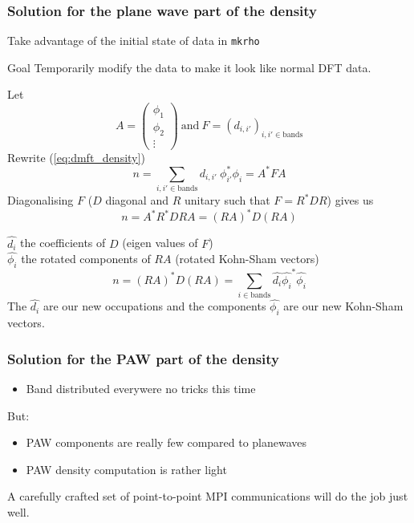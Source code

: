 \begin{frame}
  \frametitle{Solution for the plane wave part of the density}
  Take advantage of the initial state of data in \texttt{mkrho}
  
  \begin{block}{Goal}
    Temporarily modify the data to make it look like normal DFT data.
  \end{block}
\end{frame}

\renewcommand{\hat}{\widehat}
\begin{frame}
  Let
  \begin{equation}
    A =
    \left(
    \begin{matrix}
      \phi_1\\
      \phi_2\\
      \vdots
    \end{matrix}
    \right)~\text{and}~F = {(d_{i,i'})}_{i,i' \in \text{bands}}
  \end{equation}
  Rewrite (\ref{eq:dmft_density})
  \begin{equation}
    n =
    \sum_{i, i' \in \text{bands}} d_{i,i'}~\phi_{i'}^* \phi_i
    = A^* F A
  \end{equation}
  Diagonalising $F$ ($D$ diagonal and $R$ unitary such that $F = R^*  D R$) gives us
  \begin{equation}
    n = A^* R^* D R A
      = {(R A)}^* D (R A)
  \end{equation}
\end{frame}

\begin{frame}
  $\hat{d_i}$ the coefficients of $D$ (eigen values of $F$) \\
  $\hat{\phi_i}$ the rotated components of $RA$ (rotated Kohn-Sham vectors)
  \begin{equation}
    n = (R A)^* D (R A)  = \sum_{i \in \text{bands}} \hat{d_i} \hat{\phi_i}^* \hat{\phi_i}
  \end{equation}
  The $\hat{d_i}$ are our new occupations and the components $\hat{\phi_i}$ are our new Kohn-Sham vectors.
\end{frame}

\begin{frame}
  \frametitle{Solution for the PAW part of the density}
  \begin{itemize}
    \item Band distributed everywere \Rightarrow no tricks this time
  \end{itemize}
  But:
  \begin{itemize}
    \item PAW components are really few compared to planewaves
    \item PAW density computation is rather light
  \end{itemize}
  A carefully crafted set of point-to-point MPI communications will do the job
  just well.
\end{frame}

